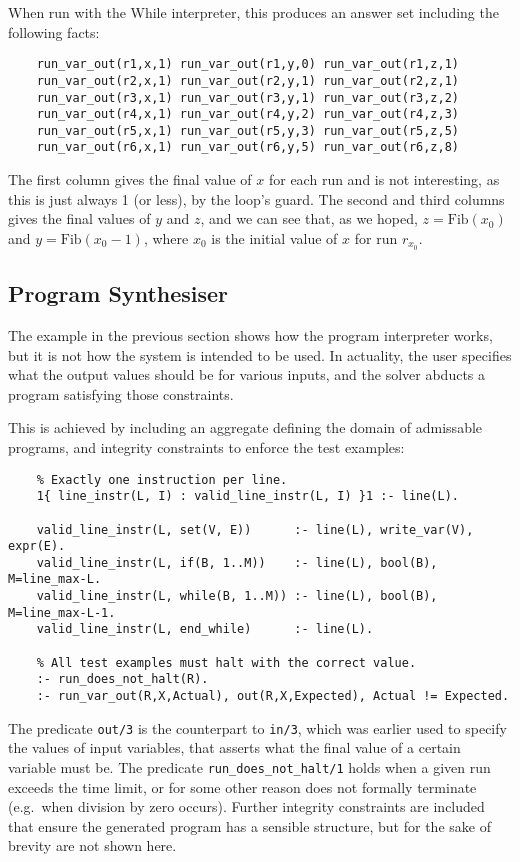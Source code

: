 \documentclass[a4paper,twoside,notitlepage]{article}
\newcommand{\ttt}{\texttt}
\begin{document}
When run with the While interpreter, this produces an answer set including the 
following facts:
\begin{verbatim}
    run_var_out(r1,x,1) run_var_out(r1,y,0) run_var_out(r1,z,1) 
    run_var_out(r2,x,1) run_var_out(r2,y,1) run_var_out(r2,z,1) 
    run_var_out(r3,x,1) run_var_out(r3,y,1) run_var_out(r3,z,2) 
    run_var_out(r4,x,1) run_var_out(r4,y,2) run_var_out(r4,z,3)
    run_var_out(r5,x,1) run_var_out(r5,y,3) run_var_out(r5,z,5)
    run_var_out(r6,x,1) run_var_out(r6,y,5) run_var_out(r6,z,8) 
\end{verbatim}
The first column gives the final value of $x$ for each run and is not 
interesting, as this is just always 1 (or less), by the loop's guard. The 
second and third columns gives the final values of $y$ and $z$, and we can see 
that, as we hoped, $z=\textrm{Fib}(x_0)$ and $y=\textrm{Fib}(x_0-1)$, where 
$x_0$ is the initial value of $x$ for run $r_{x_0}$.

\subsection{Program Synthesiser} \label{sec:prgsyn}

The example in the previous section shows how the program interpreter 
works, but it is not how the system is intended to be used. In actuality, 
the user specifies what the output values should be for various inputs, 
and the solver abducts a program satisfying those constraints.

This is achieved by including an aggregate defining the domain of 
admissable programs, and integrity constraints to enforce the test 
examples:
\begin{verbatim}
    % Exactly one instruction per line.
    1{ line_instr(L, I) : valid_line_instr(L, I) }1 :- line(L).
    
    valid_line_instr(L, set(V, E))      :- line(L), write_var(V), expr(E).
    valid_line_instr(L, if(B, 1..M))    :- line(L), bool(B), M=line_max-L.
    valid_line_instr(L, while(B, 1..M)) :- line(L), bool(B), M=line_max-L-1.
    valid_line_instr(L, end_while)      :- line(L).
    
    % All test examples must halt with the correct value.
    :- run_does_not_halt(R).
    :- run_var_out(R,X,Actual), out(R,X,Expected), Actual != Expected.
\end{verbatim}
The predicate \ttt{out/3} is the counterpart to \ttt{in/3}, which was 
earlier used to specify the values of input variables, that asserts what 
the final value of a certain variable must be. The predicate 
\ttt{run\_does\_not\_halt/1} holds when a given run exceeds the time 
limit, or for some other reason does not formally terminate (e.g.\ when 
division by zero occurs). Further integrity constraints are included that 
ensure the generated program has a sensible structure, but for the sake of 
brevity are not shown here.
\end{document}
